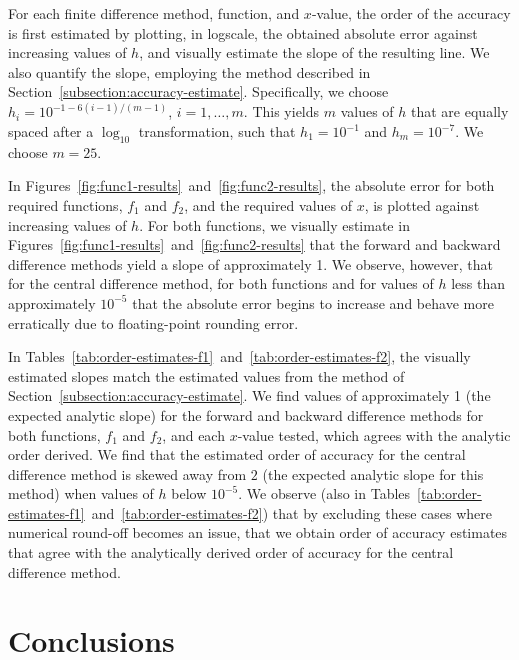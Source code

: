 \documentclass[11pt]{article}
\begin{document}
For each finite difference method, function, and $x$-value, the order of the accuracy is first estimated by plotting, in logscale, the obtained absolute error against increasing values of $h$, and visually estimate the slope of the resulting line. We also quantify the slope, employing the method described in Section~\ref{subsection:accuracy-estimate}. Specifically, we choose $h_i = 10^{-1-6(i-1)/(m-1)}$, $i=1,\ldots, m$. This yields $m$ values of $h$ that are equally spaced after a $\log_{10}$ transformation, such that $h_1 = 10^{-1}$ and $h_m = 10^{-7}$. We choose $m=25$.

In Figures~\ref{fig:func1-results}~and~\ref{fig:func2-results}, the absolute error for both required functions, $f_1$ and $f_2$, and the required values of $x$, is plotted against increasing values of $h$. For both functions, we visually estimate in Figures~\ref{fig:func1-results}~and~\ref{fig:func2-results} that the forward and backward difference methods yield a slope of approximately 1. We observe, however, that for the central difference method, for both functions and for values of $h$ less than approximately $10^{-5}$ that the absolute error begins to increase and behave more erratically due to floating-point rounding error.

In Tables~\ref{tab:order-estimates-f1}~and~\ref{tab:order-estimates-f2}, the visually estimated slopes match the estimated values from the method of Section~\ref{subsection:accuracy-estimate}. We find values of approximately 1 (the expected analytic slope) for the forward and backward difference methods for both functions, $f_1$ and $f_2$, and each $x$-value tested, which agrees with the analytic order derived. We find that the estimated order of accuracy for the central difference method is skewed away from $2$ (the expected analytic slope for this method) when values of $h$ below $10^{-5}$. We observe (also in Tables~\ref{tab:order-estimates-f1}~and~\ref{tab:order-estimates-f2}) that by excluding these cases where numerical round-off becomes an issue, that we obtain order of accuracy estimates that agree with the analytically derived order of accuracy for the central difference method.

\section{Conclusions}
\end{document}

